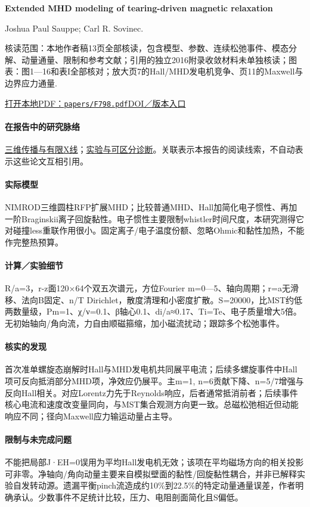 \documentclass[UTF8,a4paper,11pt,openany,fontset=fandol]{ctexbook}
\begin{document}
\textbf{Extended MHD modeling of tearing-driven magnetic relaxation}\citep{F798}\

Joshua Paul Sauppe;  Carl R. Sovinec.

\textsf{核读范围：}本地作者稿13页全部核读，包含模型、参数、连续松弛事件、模态分解、动量通量、限制和参考文献；引用的独立2016附录收敛材料未单独核读；\textsf{图表：}图1—16和表I全部核对；放大页7的Hall/MHD发电机竞争、页11的Maxwell与边界应力通量.

\href{run:../papers/F798.pdf}{打开本地PDF：\texttt{papers/F798.pdf}}\quad\href{https://doi.org/10.1063/1.4977540}{DOI／版本入口}

\paragraph{在报告中的研究脉络}\hyperref[story:three]{三维传播与有限X线}；\hyperref[story:diagnostic]{实验与可区分诊断}。关联表示本报告的阅读线索，不自动表示这些论文互相引用。

\paragraph{实际模型}NIMROD三维圆柱RFP扩展MHD；比较普通MHD、Hall加简化电子惯性、再加一阶Braginskii离子回旋黏性。电子惯性主要限制whistler时间尺度，本研究测得它对碰撞less重联作用很小。固定离子/电子温度份额、忽略Ohmic和黏性加热，不能作完整热预算。

\paragraph{计算／实验细节}R/a=3，r-z面120×64个双五次谱元，方位Fourier m=0—5、轴向周期；r=a无滑移、法向B固定、n/T Dirichlet，散度清理和小密度扩散。S=20000，比MST约低两数量级，Pm=1、χ/ν=0.1、β轴心0.1、di/a≈0.17、Ti=Te、电子质量增大5倍。无初始轴向/角向流，力自由顺磁箍缩，加小磁流扰动；跟踪多个松弛事件。

\paragraph{核实的发现}首次准单螺旋态崩解时Hall与MHD发电机共同展平电流；后续多螺旋事件中Hall项可反向抵消部分MHD项，净效应仍展平。主m=1, n=6贡献下降、n=5/7增强与反向Hall相关。对应Lorentz力先于Reynolds响应，后者通常抵消前者；后续事件核心电流和速度改变量同向，与MST集合观测方向更一致。总磁松弛相近但动能响应不同；径向Maxwell应力输运动量占主导。

\paragraph{限制与未完成问题}不能把局部J·EH=0误用为平均Hall发电机无效；该项在平均磁场方向的相关投影可非零。净轴向/角向动量主要来自模拟壁面的黏性/回旋黏性耦合，并非已解释实验自发转动源。遗漏平衡pinch流造成约10\%到22.5\%的特定动量通量误差，作者明确承认。少数事件不足统计比较，压力、电阻剖面简化且S偏低。
\end{document}
